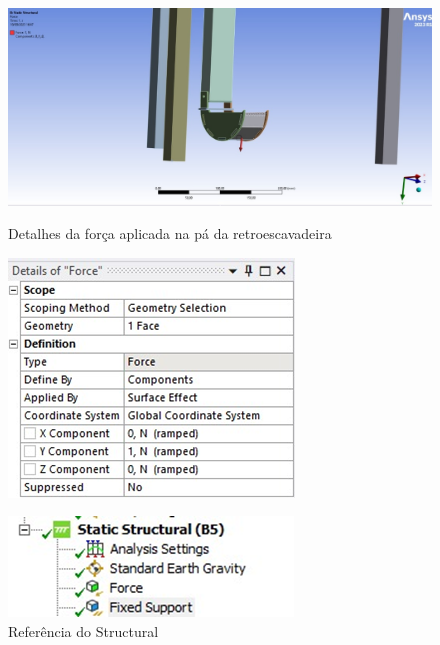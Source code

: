 \documentclass[deposito, acronym, symbols]{fei}
\begin{document}
 \begin{figure}[!htb]
 \centering
    \caption{Detalhes da força aplicada na pá da retroescavadeira}
    \includegraphics[width=0.8\linewidth]{Imagens/foto_força aplicada.png}
    \label{fig:foto_força aplicada}
 \end{figure}

 \begin{figure}[!htp]
  \centering
  \begin{minipage}{0.6\textwidth}
        \caption{Referência do Structural}
        \includegraphics[width=0.65\linewidth]{Imagens/força aplicada_1.png}
        \label{fig:força aplicada_1}
  \end{minipage}
  \hfill
  \begin{minipage}{0.7\textwidth}
        \includegraphics[width=0.6\linewidth]{Imagens/força aplicada _2.png}
  \end{minipage}
\end{figure}
\end{document}
